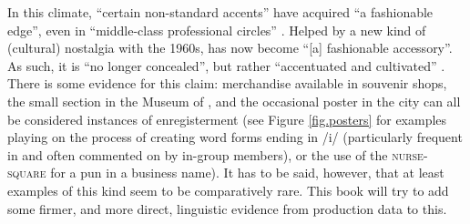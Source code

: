 In this climate, ``certain non-standard accents'' have acquired ``a fashionable edge'', even in ``middle-class professional circles'' \parencite[58]{belchem2006d}.
Helped by a new kind of (cultural) nostalgia with the 1960s,  has now become ``[a] fashionable accessory''.
As such, it is ``no longer concealed'', but rather ``accentuated and cultivated'' \citep[58]{belchem2006d}.
There is some evidence for this claim: merchandise available in souvenir shops, the small  section in the Museum of , and the occasional poster in the city can all be considered instances of enregisterment (see Figure \ref{fig.posters} for examples playing on the process of creating word forms ending in /i/ (particularly frequent in  and often commented on by in-group members), or the use of the \textsc{nurse}-\textsc{square}  for a pun in a business name).
It has to be said, however, that  at least examples of this kind seem to be comparatively rare.
This book will try to add some firmer, and more direct, linguistic evidence from production data to this.

